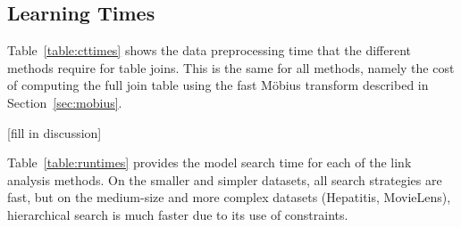 \documentclass{article}
\begin{document}
\subsection{Learning Times} Table~\ref{table:cttimes} shows the data preprocessing time that the different methods require for table joins. This is the same for all methods, namely the cost of computing the full join table using the fast M\"obius transform described in Section~\ref{sec:mobius}. 
\begin{table} \centering
\caption{Contengency Table (C.T.) Description : Building Time  in seconds. %
 \label{table:cttimes}}
\end{table}


[fill in discussion] 


Table~\ref{table:runtimes}
 provides the model search time for each of the link analysis methods. 
On the smaller and simpler datasets, all search strategies are fast, 
but on the medium-size and more complex datasets (Hepatitis, MovieLens), hierarchical search is much faster due to its use of constraints.
\end{document}
